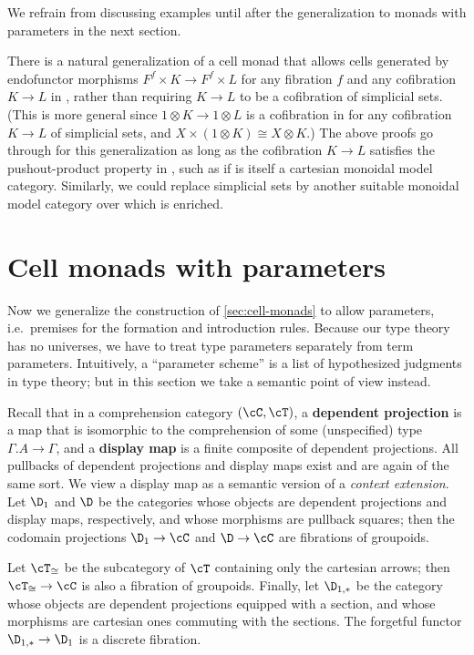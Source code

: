 \documentclass[referee]{psp}
\let\C\cC
\let\T\cT
\begin{document}
We refrain from discussing examples until after the generalization to monads with parameters in the next section.

\begin{rmk}
  There is a natural generalization of a cell monad that allows cells generated by endofunctor morphisms $F^f\times K \to F^f \times L$ for any fibration $f$ and any cofibration $K\to L$ in \sM, rather than requiring $K\to L$ to be a cofibration of simplicial sets.
  (This is more general since $1\otimes K \to 1\otimes L$ is a cofibration in \sM for any cofibration $K\to L$ of simplicial sets, and $X\times (1\otimes K) \cong X\otimes K$.)
  The above proofs go through for this generalization as long as the cofibration $K\to L$ satisfies the pushout-product property in \sM, such as if \sM is itself a cartesian monoidal model category.
  Similarly, we could replace simplicial sets by another suitable monoidal model category over which \sM is enriched.
\end{rmk}


\section{Cell monads with parameters}
\label{sec:cell-monads-param}

Now we generalize the construction of \cref{sec:cell-monads} to allow parameters, i.e.\ premises for the formation and introduction rules.
Because our type theory has no universes, we have to treat type parameters separately from term parameters.
Intuitively, a ``parameter scheme'' is a list of hypothesized judgments in type theory; but in this section we take a semantic point of view instead.

Recall that in a comprehension category $(\C,\T)$, a \textbf{dependent projection} is a map that is isomorphic to the comprehension of some (unspecified) type $\Gamma.A\to\Gamma$, and a \textbf{display map} is a finite composite of dependent projections.
All pullbacks of dependent projections and display maps exist and are again of the same sort.
We view a display map as a semantic version of a \emph{context extension}.
Let $\D_1$ and $\D$ be the categories whose objects are dependent projections and display maps, respectively, and whose morphisms are pullback squares; then the codomain projections $\D_1\to\C$ and $\D\to\C$ are fibrations of groupoids.

Let $\T_{\cong}$ be the subcategory of $\T$ containing only the cartesian arrows; then $\T_{\cong}\to\C$ is also a fibration of groupoids.
Finally, let $\D_{1,*}$ be the category whose objects are dependent projections equipped with a section, and whose morphisms are cartesian ones commuting with the sections.
The forgetful functor $\D_{1,*} \to \D_1$ is a discrete fibration.
\end{document}
